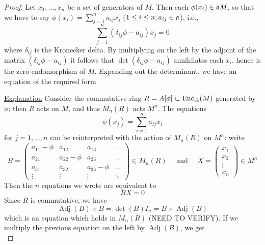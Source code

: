 \documentclass[11pt]{article}
\DeclareMathOperator{\Adj}{Adj}
\begin{document}
\begin{proof}
Let \(x_1,\dots,x_n\) be a set of generators of \(M\). Then each \(\phi(x_i)\in\mathfrak{a} M\), so that we have to
say \(\phi(x_i)=\sum_{j=1}^na_{ij}x_j\) (\(1\le i\le n;a_{ij}\in\mathfrak{a}\)), i.e.,
\begin{equation*}
\sum_{j=1}^n(\delta_{ij}\phi-a_{ij})x_j=0
\end{equation*}
where \(\delta_{ij}\) is the Kronecker delta. By multiplying on the left by the adjoint of the
matrix \((\delta_{ij}\phi-a_{ij})\) it follows that \(\det(\delta_{ij}\phi-a_{ij})\) annihilates each \(x_i\),
hence is the zero endomorphism of \(M\). Expanding out the determinant, we have an equation of
the required form

\label{Problem2}
\href{https://math.stackexchange.com/questions/1197842/proof-of-proposition-2-4-in-atiyah-macdonald/1197946}{Explanation}
Consider the commutative ring \(R=A[\phi]\subset\operatorname{End}_A(M)\) generated by \(\phi\); then \(R\) acts on \(M\), and
thus \(M_n(R)\) acts \(M^n\). The equations
\begin{equation*}
\phi(x_j)=\sum_{i=1}^na_{ij}x_i
\end{equation*}
for \(j=1,\dots,n\) can be reinterpreted with the action of \(M_n(R)\) on \(M^n\): write
\begin{equation*}
B=
\begin{pmatrix}
a_{11}-\phi&a_{12}&a_{13}&\dots\\
a_{21}&a_{22}-\phi&a_{23}&\dots\\
a_{31}&a_{32}&a_{33}-\phi&\dots\\
\vdots&\vdots&\vdots&\ddots
\end{pmatrix}\in M_n(R) \quad\text{ and }\quad
X=
\begin{pmatrix}
x_1\\x_2\\\vdots\\x_n
\end{pmatrix}\in M^n
\end{equation*}
Then the \(n\) equations we wrote are equivalent to
\begin{equation*}
BX=0
\end{equation*}
Since \(R\) is commutative, we have
\begin{equation*}
\Adj(B)\times B=\det(B)I_n=B\times \Adj(B)
\end{equation*}
which is an equation which holds in \(M_n(R)\) (NEED TO VERIFY). If we multiply the previous
equation on the left by \(\Adj(B)\), we get
\begin{equation*}

\end{equation*}
\end{proof}
\end{document}

